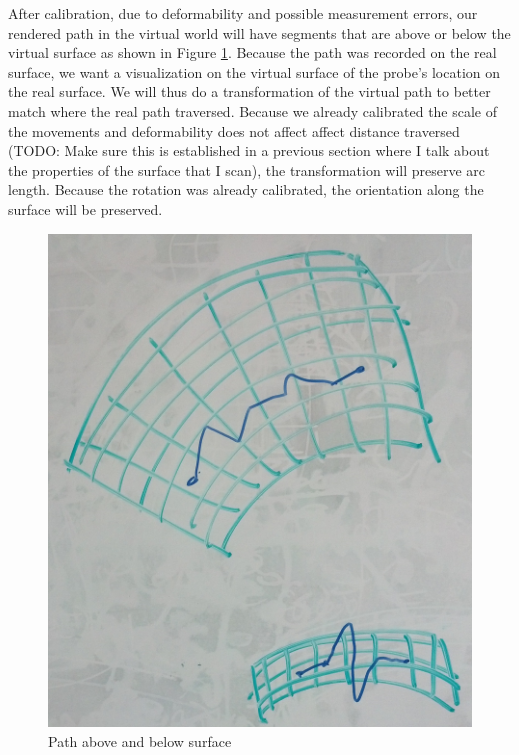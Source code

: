 After calibration, due to deformability and possible measurement errors, our rendered path in the virtual world will have segments that are above or below the virtual surface as shown in Figure \ref{pathsAboveAndBelow}. Because the path was recorded on the real surface, we want a visualization on the virtual surface of the probe's location on the real surface. We will thus do a transformation of the virtual path to better match where the real path traversed. Because we already calibrated the scale of the movements and deformability does not affect affect distance traversed (TODO: Make sure this is established in a previous section where I talk about the properties of the surface that I scan), the transformation will preserve arc length. Because the rotation was already calibrated, the orientation along the surface will be preserved.

\begin{figure}[ht]
\centering
\includegraphics[width=\columnwidth]{pathaboveandbelow.jpg}
\caption{Path above and below surface}
\label{pathsAboveAndBelow}
\end{figure}

